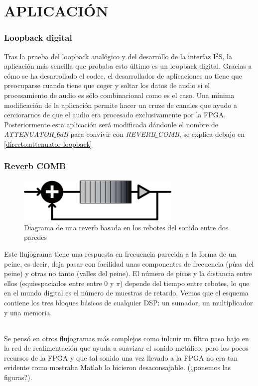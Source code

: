 \part{APLICACIÓN}

\section{Loopback digital}
	Tras la prueba del loopback analógico y del desarrollo de la interfaz I$^2$S, la  aplicación más sencilla que probaba esto último es un loopback digital. Gracias a cómo se ha desarrollado el codec, el desarrollador de aplicaciones no tiene que preocuparse cuando tiene que coger y soltar los datos de audio si el procesamiento de audio es sólo combinacional como es el caso.
	Una mínima modificación de la aplicación permite hacer un cruze de canales que ayudo a cerciorarnos de que el audio era procesado exclusivamente por la FPGA. Posteriormente esta aplicación será modificada dándonle el nombre de \emph{ATTENUATOR$\_$6dB} para convivir con \emph{REVERB$\_$COMB}, se explica debajo en \ref{directo:attenuator-loopback}

\section{Reverb COMB}
\begin{figure}[h]
\begin{center}
	\includegraphics[width=0.7\textwidth]{./reverb_simple_diagram-eps-converted-to}
\caption{Diagrama de una reverb basada en los rebotes del sonido entre dos paredes}
\end{center}
\end{figure}
	Este flujograma tiene una respuesta en frecuencia parecida a la forma de un peine, es decir, deja pasar con facilidad unas componentes de frecuencia (púas del peine) y otras no tanto (valles del peine). El número de picos y la distancia entre ellos (equiespaciados entre entre 0 y $\pi$) depende del tiempo entre rebotes, lo que en el mundo digital es el número de muestras de retardo. Vemos que el esquema contiene los tres bloques básicos de cualquier DSP: un sumador, un multiplicador y una memoria.
	
\paragraph{} Se pensó en otros flujogramas más complejos como inlcuir un filtro paso bajo en la red de realimentación que ayuda a suavizar el sonido metálico, pero los pocos recursos de la FPGA y que tal sonido una vez llevado a la FPGA no era tan evidente como mostraba Matlab lo hicieron desaconsajable. (¿ponemos las figuras?).
